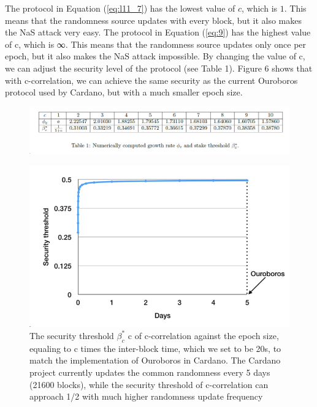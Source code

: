 The protocol in Equation (\ref{eq:l11_7}) has the lowest value of $c$, which is $1$. This means that the randomness source updates with every block, but it also makes the NaS attack very easy. The protocol in Equation (\ref{eq:9}) has the highest value of c, which is ∞. This means that the randomness source updates only once per epoch, but it also makes the NaS attack impossible. By changing the value of c, we can adjust the security level of the protocol (see Table 1). Figure 6 shows that with c-correlation, we can achieve the same security as the current Ouroboros protocol used by Cardano, but with a much smaller epoch size.
\begin{figure}[h!]
	\centering
	\includegraphics[width=\linewidth]{Fig/L11_F6}
\end{figure}
\begin{figure}[h!]
	\centering
	\includegraphics[width=0.5\linewidth]{Fig/L11_F7}
	\caption{The security threshold $\beta_c^*$
		c of c-correlation against the epoch size, equaling to c times the
		inter-block time, which we set to be 20s, to match the implementation of Ouroboros in Cardano. The
		Cardano project currently updates the common randomness every 5 days (21600 blocks), while the
		security threshold of c-correlation can approach 1/2 with much higher randomness update frequency}
	\label{fig:l11_f7}
\end{figure}


